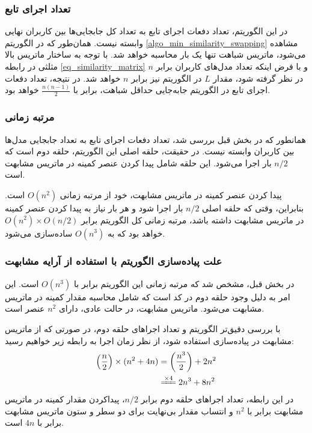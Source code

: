 \subsubsection{
	تعداد اجرای تابع
}
در این الگوریتم، تعداد دفعات اجرای تابع
به تعداد کل جابجایی‌ها بین کاربران نهایی وابسته نیست. همان‌طور که در الگوریتم
\ref{algo_min_similarity_swapping}
مشاهده می‌شود، ماتریس شباهت تنها یک بار محاسبه خواهد شد. با توجه به ساختار ماتریس بالا مثلثی در رابطه
\ref{eq_similarity_matrix}
و با فرض اینکه تعداد مدل‌های کاربران برابر \(n\) در نظر گرفته شود، مقدار \(L\) در الگوریتم نیز برابر \(n\) خواهد شد. در نتیجه، تعداد دفعات اجرای تابع
در الگوریتم جابه‌جایی حداقل شباهت، برابر با \(\frac{n(n-1)}{2}\) خواهد بود.


\subsubsection{مرتبه زمانی}
همانطور که در بخش قبل بررسی شد، تعداد دفعات اجرای تابع
به تعداد جابجایی‌ مدل‌ها بین کاربران وابسته نیست. در حقیقت، حلقه اصلی این الگوریتم، حلقه دوم است که \(n/2\) بار اجرا می‌شود. این حلقه شامل پیدا کردن عنصر کمینه در ماتریس مشابهت است. 

پیدا کردن عنصر کمینه در ماتریس مشابهت، خود از مرتبه زمانی \(O(n^2)\) است. بنابراین، وقتی که حلقه اصلی \(n/2\) بار اجرا شود و هر بار نیاز به پیدا کردن عنصر کمینه در ماتریس مشابهت داشته باشد، مرتبه زمانی کل الگوریتم برابر \(O(n^2) \times O(n/2)\) خواهد بود که به \(O(n^3)\) ساده‌سازی می‌شود.


\subsubsection{
	علت پیاده‌سازی الگوریتم با استفاده از آرایه مشابهت
}
در بخش قبل، مشخص شد که مرتبه زمانی این الگوریتم برابر با \(O(n^3)\) است. این امر به دلیل وجود حلقه دوم در کد است که شامل محاسبه مقدار کمینه در ماتریس مشابهت می‌شود. ماتریس مشابهت، در حالت عادی، دارای \(n^2\) عنصر است.

با بررسی دقیق‌تر الگوریتم و تعداد اجراهای حلقه دوم، در صورتی که از ماتریس مشابهت در پیاده‌سازی استفاده شود، از نظر زمان اجرا به رابطه زیر خواهیم رسید:
\begin{equation}
	\begin{align*} 
		\left(\frac{n}{2}\right) \times (n^2 + 4n) &= \left(\frac{n^3}{2}\right)+2n^2 \\
		 &\xlongequal{\times 4} 2n^3 + 8n^2
	\end{align*}
\end{equation}
در این رابطه، تعداد اجراهای حلقه دوم برابر \(n/2\)، پیداکردن مقدار کمینه در ماتریس مشابهت برابر با \(n^2\) و انتساب مقدار بی‌نهایت برای دو سطر و ستون ماتریس مشابهت برابر با \(4n\) است.

